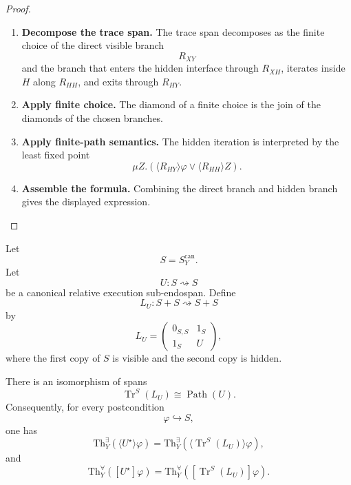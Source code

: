 \begin{proof}
\leavevmode
\begin{enumerate}
  \item \textbf{Decompose the trace span.}
  The trace span decomposes as the finite choice of the direct visible branch
  \[
    R_{XY}
  \]
  and the branch that enters the hidden interface through \(R_{XH}\), iterates
  inside \(H\) along \(R_{HH}\), and exits through \(R_{HY}\).

  \item \textbf{Apply finite choice.}
  The diamond of a finite choice is the join of the diamonds of the chosen
  branches.

  \item \textbf{Apply finite-path semantics.}
  The hidden iteration is interpreted by the least fixed point
  \[
    \mu Z.
    \left(
      \langle R_{HY}\rangle\varphi
      \vee
      \langle R_{HH}\rangle Z
    \right).
  \]

  \item \textbf{Assemble the formula.}
  Combining the direct branch and hidden branch gives the displayed
  expression.
\end{enumerate}
\end{proof}

Let
\[
  S=S^{\mathrm{can}}_Y.
\]
Let
\[
  U:S\rightsquigarrow S
\]
be a canonical relative execution sub-endospan.  Define
\[
  L_U:S+S\rightsquigarrow S+S
\]
by
\[
  L_U
  =
  \begin{pmatrix}
    0_{S,S} & 1_S\\
    1_S & U
  \end{pmatrix},
\]
where the first copy of \(S\) is visible and the second copy is hidden.

\begin{theorem}
\label{thm:path-star-as-feedback-trace}
There is an isomorphism of spans
\[
  \operatorname{Tr}^S(L_U)
  \cong
  \operatorname{Path}(U).
\]
Consequently, for every postcondition
\[
  \varphi\hookrightarrow S,
\]
one has
\[
  \mathrm{Th}^{\exists}_Y
  \left(
    \langle U^\star\rangle\varphi
  \right)
  =
  \mathrm{Th}^{\exists}_Y
  \left(
    \langle\operatorname{Tr}^S(L_U)\rangle\varphi
  \right),
\]
and
\[
  \mathrm{Th}^{\forall}_Y
  \left(
    [U^\star]\varphi
  \right)
  =
  \mathrm{Th}^{\forall}_Y
  \left(
    [\operatorname{Tr}^S(L_U)]\varphi
  \right).
\]
\end{theorem}

